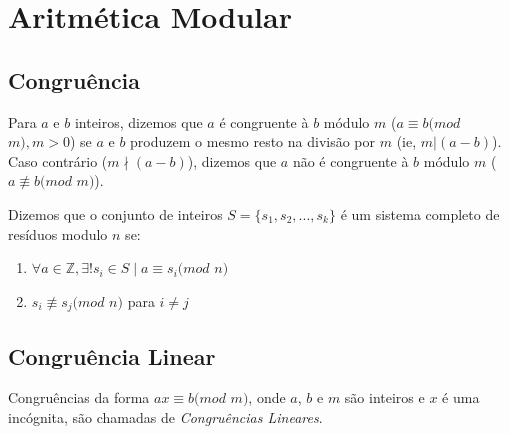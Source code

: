 
\chapter{Aritmética Modular} %

\label{Chapter2} %


\section{Congruência}

\begin{definition}
Para $a$ e $b$ inteiros, dizemos que $a$ é congruente à $b$ módulo $m$ ($a \equiv b (mod$ $m), m > 0$) 
se $a$ e $b$ produzem o mesmo resto na divisão por $m$ (ie, $m|(a-b)$).
Caso contrário ($m\nmid (a-b)$), dizemos que $a$ não é congruente à $b$ módulo $m$ ($a \not\equiv b (mod $ $m)$).
\end{definition}

\begin{definition}
Dizemos que o conjunto de inteiros $S = \{s_1, s_2, ..., s_k\}$ é um sistema completo de resíduos modulo $n$ se:
\begin{enumerate}
\item$\forall a \in \mathbb{Z}, \exists! s_i \in S \mid a \equiv s_i (mod$ $n)$
\item$s_i \not\equiv s_j (mod $ $n)$ para $i \neq j$
\end{enumerate}
\end{definition}


\section{Congruência Linear}

\begin{definition}
Congruências da forma $ax \equiv b (mod$ $m)$, onde $a$, $b$ e $m$ são inteiros e $x$ é uma incógnita, são chamadas de \textit{Congruências Lineares}.
\end{definition}



